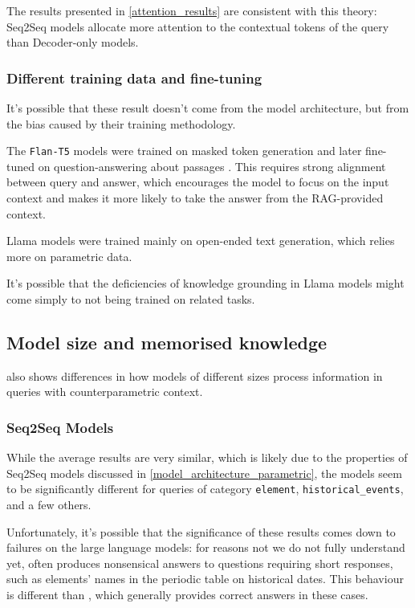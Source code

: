 The results presented in \cref{attention_results} are consistent with this theory: Seq2Seq models allocate more attention to the contextual tokens of the query than Decoder-only models.

\subsubsection{Different training data and fine-tuning}

It's possible that these result doesn't come from the model architecture, but from the bias caused by their training methodology.

The \texttt{Flan-T5} models were trained on masked token generation and later fine-tuned on question-answering about passages \citep{flant5}.
This requires strong alignment between query and answer, which encourages the model to focus on the input context and makes it more likely to take the answer from the RAG-provided context.

Llama models were trained mainly on open-ended text generation, which relies more on parametric data.

It's possible that the deficiencies of knowledge grounding in Llama models might come simply to not being trained on related tasks.

\subsection{Model size and memorised knowledge}
\label{model_size_parametric}

 also shows differences in how models of different sizes process information in queries with counterparametric context.

\subsubsection{Seq2Seq Models}

While the average results are very similar, which is likely due to the properties of Seq2Seq models discussed in \cref{model_architecture_parametric}, the models seem to be significantly different for queries of category \texttt{element}, \texttt{historical\_events}, and a few others.

Unfortunately, it's possible that the significance of these results comes down to failures on the large language models: for reasons not we do not fully understand yet, \smallflan{} often produces nonsensical answers to questions requiring short responses, such as elements' names in the periodic table on historical dates.
This behaviour is different than \bigflan{}, which generally provides correct answers in these cases.

